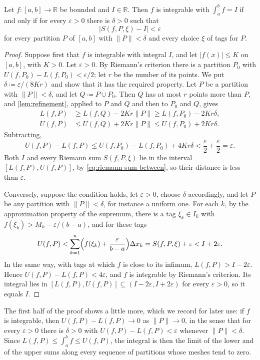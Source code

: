 \begin{theorem}
\label{thm:riemann-sums}
Let $f\colon[a,b]\to\mathbb R$ be bounded and $I\in\mathbb R$. Then $f$ is integrable with $\int_a^bf=I$ if and only if for every $\varepsilon>0$ there is $\delta>0$ such that
\[
\bigl|S(f,P,\xi)-I\bigr|<\varepsilon
\]
for every partition $P$ of $[a,b]$ with $\|P\|<\delta$ and every choice $\xi$ of tags for $P$.
\end{theorem}

\begin{proof}
Suppose first that $f$ is integrable with integral $I$, and let $|f(x)|\le K$ on $[a,b]$, with $K>0$. Let $\varepsilon>0$. By Riemann's criterion there is a partition $P_0$ with $U(f,P_0)-L(f,P_0)<\varepsilon/2$; let $r$ be the number of its points. We put $\delta\coloneqq\varepsilon/(8Kr)$ and show that it has the required property. Let $P$ be a partition with $\|P\|<\delta$, and let $Q\coloneqq P\cup P_0$. Then $Q$ has at most $r$ points more than $P$, and \cref{lem:refinement}, applied to $P$ and $Q$ and then to $P_0$ and $Q$, gives
\begin{align*}
L(f,P)&\ge L(f,Q)-2Kr\|P\|\ge L(f,P_0)-2Kr\delta,\\
U(f,P)&\le U(f,Q)+2Kr\|P\|\le U(f,P_0)+2Kr\delta .
\end{align*}
Subtracting,
\[
U(f,P)-L(f,P)\le U(f,P_0)-L(f,P_0)+4Kr\delta<\frac\varepsilon2+\frac\varepsilon2=\varepsilon .
\]
Both $I$ and every Riemann sum $S(f,P,\xi)$ lie in the interval $[L(f,P),U(f,P)]$, by \eqref{eq:riemann-sum-between}, so their distance is less than $\varepsilon$.

Conversely, suppose the condition holds, let $\varepsilon>0$, choose $\delta$ accordingly, and let $P$ be any partition with $\|P\|<\delta$, for instance a uniform one. For each $k$, by the approximation property of the supremum, there is a tag $\xi_k\in I_k$ with $f(\xi_k)>M_k-\varepsilon/(b-a)$, and for these tags
\[
U(f,P)<\sum_{k=1}^n\Bigl(f(\xi_k)+\frac\varepsilon{b-a}\Bigr)\Delta x_k=S(f,P,\xi)+\varepsilon<I+2\varepsilon .
\]
In the same way, with tags at which $f$ is close to its infimum, $L(f,P)>I-2\varepsilon$. Hence $U(f,P)-L(f,P)<4\varepsilon$, and $f$ is integrable by Riemann's criterion. Its integral lies in $[L(f,P),U(f,P)]\subseteq(I-2\varepsilon,I+2\varepsilon)$ for every $\varepsilon>0$, so it equals $I$.
\end{proof}

The first half of the proof shows a little more, which we record for later use: if $f$ is integrable, then $U(f,P)-L(f,P)\to0$ as $\|P\|\to0$, in the sense that for every $\varepsilon>0$ there is $\delta>0$ with $U(f,P)-L(f,P)<\varepsilon$ whenever $\|P\|<\delta$. Since $L(f,P)\le\int_a^bf\le U(f,P)$, the integral is then the limit of the lower and of the upper sums along every sequence of partitions whose meshes tend to zero.

